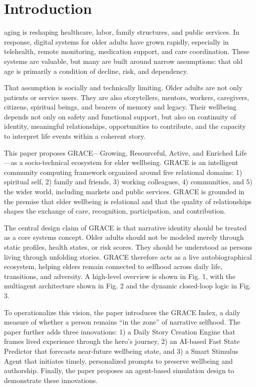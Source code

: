 \documentclass[
  journal,
]{IEEEtran}%
\begin{document}
\section{Introduction}\label{sec-intro}

 aging is reshaping healthcare, labor, family
structures, and public services. In response, digital systems for older
adults have grown rapidly, especially in telehealth, remote monitoring,
medication support, and care coordination. These systems are valuable,
but many are built around narrow assumptions: that old age is primarily
a condition of decline, risk, and dependency.

That assumption is socially and technically limiting. Older adults are
not only patients or service users. They are also storytellers, mentors,
workers, caregivers, citizens, spiritual beings, and bearers of memory
and legacy. Their wellbeing depends not only on safety and functional
support, but also on continuity of identity, meaningful relationships,
opportunities to contribute, and the capacity to interpret life events
within a coherent story.

This paper proposes GRACE---Growing, Resourceful, Active, and Enriched
Life---as a socio-technical ecosystem for elder wellbeing. GRACE is an
intelligent community computing framework organized around five
relational domains: 1) spiritual self, 2) family and friends, 3) working
colleagues, 4) communities, and 5) the wider world, including markets
and public services. GRACE is grounded in the premise that elder
wellbeing is relational and that the quality of relationships shapes the
exchange of care, recognition, participation, and contribution.

The central design claim of GRACE is that narrative identity should be
treated as a core systems concept. Older adults should not be modeled
merely through static profiles, health states, or risk scores. They
should be understood as persons living through unfolding stories. GRACE
therefore acts as a live autobiographical ecosystem, helping elders
remain connected to selfhood across daily life, transitions, and
adversity. A high-level overview is shown in Fig. 1, with the multiagent
architecture shown in Fig. 2 and the dynamic closed-loop logic in Fig.
3.

To operationalize this vision, the paper introduces the GRACE Index, a
daily measure of whether a person remains ``in the zone'' of narrative
selfhood. The paper further adds three innovations: 1) a Daily Story
Creation Engine that frames lived experience through the hero's journey,
2) an AI-based Fast State Predictor that forecasts near-future wellbeing
state, and 3) a Smart Stimulus Agent that initiates timely, personalized
prompts to preserve wellbeing and authorship. Finally, the paper
proposes an agent-based simulation design to demonstrate these
innovations.
\end{document}
